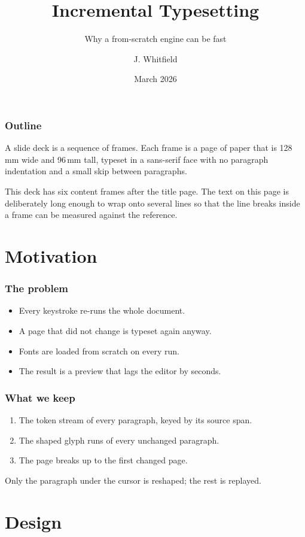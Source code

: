 \documentclass{beamer}
\title[Incremental]{Incremental Typesetting}
\subtitle{Why a from-scratch engine can be fast}
\author[Whitfield]{J. Whitfield}
\institute[FlashTeX]{FlashTeX corpus}
\date{March 2026}
\begin{document}
\begin{frame}
  \titlepage
\end{frame}

\begin{frame}
  \frametitle{Outline}
  A slide deck is a sequence of frames. Each frame is a page of paper that is
  128\,mm wide and 96\,mm tall, typeset in a sans-serif face with no paragraph
  indentation and a small skip between paragraphs.

  This deck has six content frames after the title page. The text on this
  page is deliberately long enough to wrap onto several lines so that the
  line breaks inside a frame can be measured against the reference.
\end{frame}

\section{Motivation}

\begin{frame}
  \frametitle{The problem}
  \begin{itemize}
    \item Every keystroke re-runs the whole document.
    \item A page that did not change is typeset again anyway.
    \item Fonts are loaded from scratch on every run.
    \item The result is a preview that lags the editor by seconds.
  \end{itemize}
\end{frame}

\begin{frame}
  \frametitle{What we keep}
  \begin{enumerate}
    \item The token stream of every paragraph, keyed by its source span.
    \item The shaped glyph runs of every unchanged paragraph.
    \item The page breaks up to the first changed page.
  \end{enumerate}

  Only the paragraph under the cursor is reshaped; the rest is replayed.
\end{frame}

\section{Design}
\end{document}
